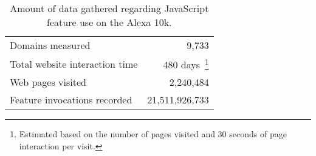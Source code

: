 \begin{table}[ht]
  \centering
  \begin{tabular}{ l r }
    \toprule
      Domains measured                    &  9,733 \\
      Total website interaction time      &  480 days~\footnote{Estimated based on the number of pages visited and 30 seconds of page interaction per visit.} \\
      Web pages visited                   &  2,240,484    \\
      Feature invocations recorded        &  21,511,926,733 \\
    \bottomrule
  \end{tabular}
  \caption{Amount of data gathered regarding JavaScript feature use on the Alexa 10k.}
  \label{fig:results-vanity-stats}
\end{table}
